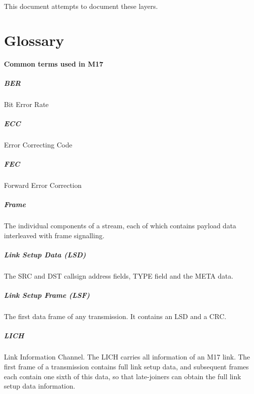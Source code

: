 \documentclass[a4paper,11pt,oneside]{book}
\begin{document}
This document attempts to document these layers.

\chapter{Glossary}

\textbf{Common terms used in M17}

\paragraph{BER}

Bit Error Rate

\paragraph{ECC}

Error Correcting Code

\paragraph{FEC}

Forward Error Correction

\paragraph{Frame}

The individual components of a stream, each of which contains payload data interleaved with frame signalling.

\paragraph{Link Setup Data (LSD)}

The SRC and DST callsign address fields, TYPE field and the META data.

\paragraph{Link Setup Frame (LSF)}

The first data frame of any transmission. It contains an LSD and a CRC.

\paragraph{LICH}

Link Information Channel. The LICH carries all information of an M17 link. The first frame of a transmission contains full link setup data, and subsequent frames each contain one sixth of this data, so that late-joiners can obtain the full link setup data information\@.
\end{document}
